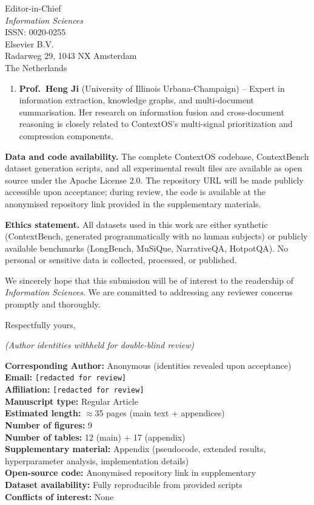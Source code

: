 \documentclass[12pt, a4paper]{letter}
\begin{document}
\begin{letter}{
  Editor-in-Chief \\
  \textit{Information Sciences} \\
  ISSN: 0020-0255 \\
  Elsevier B.V. \\
  Radarweg 29, 1043 NX Amsterdam \\
  The Netherlands
}
\begin{enumerate}
  \item \textbf{Prof.\ Heng Ji} (University of Illinois Urbana-Champaign) --
        Expert in information extraction, knowledge graphs, and multi-document
        summarisation.  Her research on information fusion and cross-document
        reasoning is closely related to ContextOS's multi-signal prioritization
        and compression components.
\end{enumerate}

\textbf{Data and code availability.}  The complete ContextOS codebase,
ContextBench dataset generation scripts, and all experimental result files are
available as open source under the Apache License 2.0.  The repository URL
will be made publicly accessible upon acceptance; during review, the code is
available at the anonymised repository link provided in the supplementary
materials.

\textbf{Ethics statement.}  All datasets used in this work are either
synthetic (ContextBench, generated programmatically with no human subjects) or
publicly available benchmarks (LongBench, MuSiQue, NarrativeQA, HotpotQA).
No personal or sensitive data is collected, processed, or published.

We sincerely hope that this submission will be of interest to the readership of
\textit{Information Sciences}.  We are committed to addressing any reviewer
concerns promptly and thoroughly.

\closing{Respectfully yours,}

\vspace{1.5cm}

\noindent
\textit{(Author identities withheld for double-blind review)}

\vspace{0.8cm}

\noindent
\textbf{Corresponding Author:} Anonymous (identities revealed upon acceptance)\\
\textbf{Email:} \texttt{[redacted for review]}\\
\textbf{Affiliation:} \texttt{[redacted for review]}\\
\textbf{Manuscript type:} Regular Article\\
\textbf{Estimated length:} $\approx$35 pages (main text + appendices)\\
\textbf{Number of figures:} 9\\
\textbf{Number of tables:} 12 (main) + 17 (appendix)\\
\textbf{Supplementary material:} Appendix (pseudocode, extended results,
hyperparameter analysis, implementation details)\\
\textbf{Open-source code:} Anonymised repository link in supplementary\\
\textbf{Dataset availability:} Fully reproducible from provided scripts\\
\textbf{Conflicts of interest:} None

\end{letter}
\end{document}
